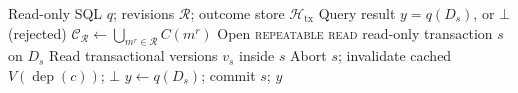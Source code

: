 \begin{algorithm}[t]
\caption{}
\label{alg:snapshot-execution}
\small
\begin{algorithmic}[1]
\Require Read-only SQL $q$; revisions $\mathcal R$; outcome store $\mathcal H_{\mathrm{tx}}$
\Ensure Query result $y = q(D_s)$, or $\bot$ (rejected)
  \State $\mathcal C_{\mathcal R} \gets \bigcup_{m^r \in \mathcal R} C(m^r)$
  \State Open \textsc{repeatable read} read-only transaction $s$ on $D_s$
  \State Read transactional versions $v_s$ inside $s$
      \State Abort $s$; invalidate cached $V(\operatorname{dep}(c))$; \Return $\bot$
    \EndIf
  \EndFor
  \State $y \gets q(D_s)$; commit $s$; \Return $y$
\EndFunction
\end{algorithmic}
\end{algorithm}
